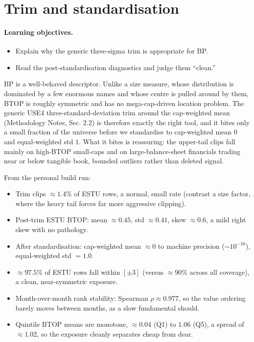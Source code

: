 \documentclass[11pt]{article}
\theoremstyle{definition}
\theoremstyle{plain}
\theoremstyle{remark}
\begin{document}
\section{Trim and standardisation}\label{sec:std}

\paragraph{Learning objectives.}
\begin{itemize}[leftmargin=1.4em,nosep]
  \item Explain why the generic three-sigma trim is appropriate for BP.
  \item Read the post-standardisation diagnostics and judge them ``clean.''
\end{itemize}

BP is a well-behaved descriptor. Unlike a size measure, whose distribution is dominated by a few enormous names and whose centre is pulled around by them, BTOP is roughly symmetric and has no mega-cap-driven location problem. The generic USE4 three-standard-deviation trim around the cap-weighted mean (Methodology Notes, Sec. 2.2) is therefore exactly the right tool, and it bites only a small fraction of the universe before we standardise to cap-weighted mean $0$ and equal-weighted std $1$. What it bites is reassuring: the upper-tail clips fall mainly on high-BTOP small-caps and on large-balance-sheet financials trading near or below tangible book, bounded outliers rather than deleted signal.

\begin{observed}
From the personal build run:
\begin{itemize}[leftmargin=1.4em,nosep]
  \item Trim clips $\approx 1.4\%$ of ESTU rows, a normal, small rate (contrast a size factor, where the heavy tail forces far more aggressive clipping).
  \item Post-trim ESTU BTOP: mean $\approx 0.45$, std $\approx 0.41$, skew $\approx 0.6$, a mild right skew with no pathology.
  \item After standardisation: cap-weighted mean $\approx 0$ to machine precision ($\sim 10^{-16}$), equal-weighted std $= 1.0$.
  \item $\approx 97.5\%$ of ESTU rows fall within $[\pm 3]$ (versus $\approx 90\%$ across all coverage), a clean, near-symmetric exposure.
  \item Month-over-month rank stability: Spearman $\rho \approx 0.977$, so the value ordering barely moves between months, as a slow fundamental should.
  \item Quintile BTOP means are monotone, $\approx 0.04$ (Q1) to $1.06$ (Q5), a spread of $\approx 1.02$, so the exposure cleanly separates cheap from dear.
\end{itemize}
\end{observed}
\end{document}
